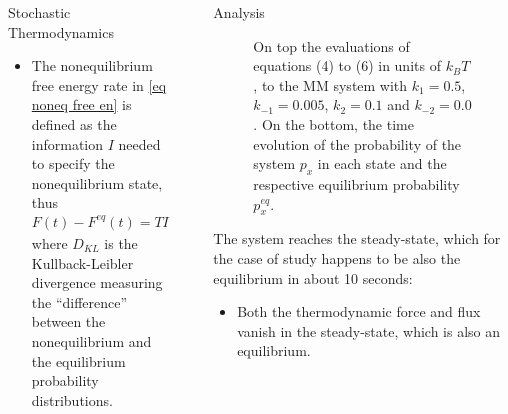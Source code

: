 \documentclass[final]{beamer}
\newlength{\sepwidth}
\newlength{\colwidth}
\newcommand{\separatorcolumn}{\begin{column}{\sepwidth}\end{column}}
\begin{document}
\begin{frame}[t]
\begin{columns}[t]
\begin{column}{\colwidth}
\begin{block}{Stochastic Thermodynamics}
\begin{itemize}
\item The nonequilibrium free energy rate in \eqref{eq noneq free en} is defined as the information $I$ needed to specify the nonequilibrium state\cite{Esposito_2011}, thus
%
\begin{equation}
{F}(t) - {F}^{eq}(t) = TI(t) \equiv TD_{KL}(p_x(t) || p_x^{eq}(t)) \geq 0
\end{equation}
%
where $D_{KL}$ is the Kullback-Leibler divergence measuring the ``difference'' between the nonequilibrium and the equilibrium probability distributions.
\end{itemize}
\end{block}

\end{column}

\separatorcolumn

\begin{column}{\colwidth}

\begin{block}{Analysis}
\begin{figure}
\vskip-30pt 
\begin{center}

\end{center}
\label{fig 2-state-system}
\caption{On top the evaluations of equations (4) to (6) in units of $k_B T$, to the MM system with $k_{1} = 0.5$, $k_{-1} = 0.005$, $k_{2} = 0.1$ and $k_{-2} = 0.0$. On the bottom, the time evolution of the probability of the system $p_{x}$ in each state and the respective equilibrium probability $p_{x}^{eq}$.}
\end{figure}

The system reaches the steady-state, which for the case of study happens to be also the equilibrium in about 10 seconds:
%
\begin{itemize}
\item Both\cite{Qian_2021} the thermodynamic force and flux vanish in the steady-state, which is also an equilibrium.


\end{itemize}
\end{block}
\end{column}
\end{columns}
\end{frame}
\end{document}
